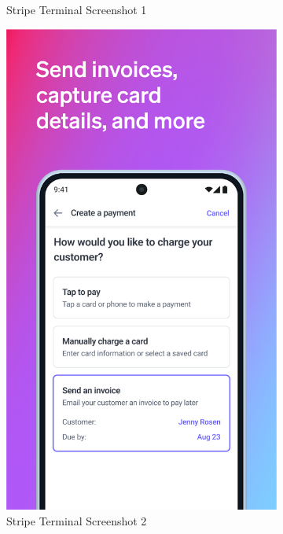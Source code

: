 \begin{figure}[!htb]
\begin{subfigure}[b]{0.32\textwidth}
        \caption{Stripe Terminal Screenshot 1}
        \label{fig:stripe_1}
    \end{subfigure}
    \hfill
    \begin{subfigure}[b]{0.32\textwidth}
        \centering
        \includegraphics[width=\textwidth]{images/stripe_screenshot_2.png}
        \caption{Stripe Terminal Screenshot 2}
        \label{fig:stripe_2}
    \end{subfigure}
    \hfill
    \begin{subfigure}[b]{0.32\textwidth}

\end{subfigure}
\end{figure}
